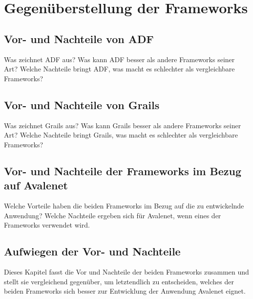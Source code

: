 \section{Gegenüberstellung der Frameworks}
\subsection{Vor- und Nachteile von ADF}
Was zeichnet ADF aus? Was kann ADF besser als andere Frameworks seiner Art?
Welche Nachteile bringt ADF, was macht es schlechter als vergleichbare Frameworks?
\subsection{Vor- und Nachteile von Grails}
Was zeichnet Grails aus? Was kann Grails besser als andere Frameworks seiner Art?
Welche Nachteile bringt Grails, was macht es schlechter als vergleichbare Frameworks?
\subsection{Vor- und Nachteile der Frameworks im Bezug auf Avalenet}
Welche Vorteile haben die beiden Frameworks im Bezug auf die zu entwickelnde Anwendung?
Welche Nachteile ergeben sich für Avalenet, wenn eines der Frameworks verwendet wird.
\subsection{Aufwiegen der Vor- und Nachteile}
Dieses Kapitel fasst die Vor und Nachteile der beiden Frameworks zusammen und stellt sie vergleichend gegenüber, um letztendlich zu entscheiden, welches der beiden Frameworks sich besser zur Entwicklung der Anwendung Avalenet eignet.